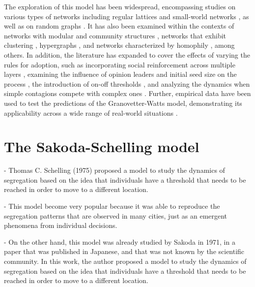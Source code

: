 The exploration of this model has been widespread, encompassing studies on various types of networks including regular lattices and small-world networks \cite{centola-2007}, as well as on random graphs \cite{gleeson-2007}. It has also been examined within the contexts of networks with modular and community structures \cite{gleeson-2008}, networks that exhibit clustering \cite{hackett-2011,hackett-2013}, hypergraphs \cite{de-arruda-2020}, and networks characterized by homophily \cite{diaz-diaz-2022}, among others. In addition, the literature has expanded to cover the effects of varying the rules for adoption, such as incorporating social reinforcement across multiple layers \cite{chen-2018}, examining the influence of opinion leaders and initial seed size on the process \cite{liu-2018, singh-2013}, the introduction of on-off thresholds \cite{dodds-2013}, and analyzing the dynamics when simple contagions compete with complex ones \cite{czaplicka-2016, min-2018, diaz-diaz-2022}. Further, empirical data have been used to test the predictions of the Granovetter-Watts model, demonstrating its applicability across a wide range of real-world situations \cite{centola-2010, karimi-2013, karsai-2014, rosenthal-2015, karsai-2016, mnsted-2017, unicomb-2018, guilbeault-2021}.

\section{\label{sec:The Sakoda-Schelling model} The Sakoda-Schelling model}

- Thomas C. Schelling (1975) proposed a model to study the dynamics of segregation based on the idea that individuals have a threshold that needs to be reached in order to move to a different location. 

- This model become very popular because it was able to reproduce the segregation patterns that are observed in many cities, just as an emergent phenomena from individual decisions.

- On the other hand, this model was already studied by Sakoda in 1971, in a paper that was published in Japanese, and that was not known by the scientific community. In this work, the author proposed a model to study the dynamics of segregation based on the idea that individuals have a threshold that needs to be reached in order to move to a different location.

